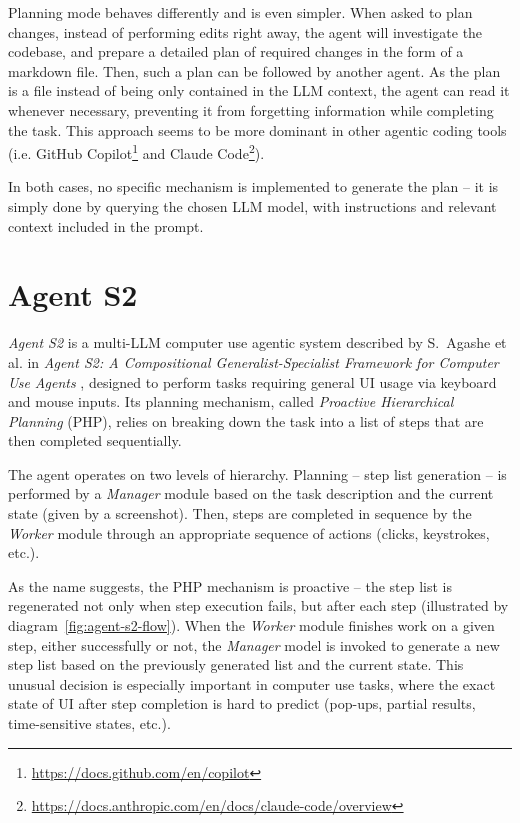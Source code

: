 \documentclass[a4paper,11pt,twoside]{report}
\theoremstyle{definition}
\begin{document}
Planning mode behaves differently and is even simpler. When asked to plan changes, instead of performing edits right away, the agent will investigate the codebase, and prepare a detailed plan of required changes in the form of a markdown file. Then, such a plan can be followed by another agent. As the plan is a file instead of being only contained in the LLM context, the agent can read it whenever necessary, preventing it from forgetting information while completing the task. This approach seems to be more dominant in other agentic coding tools (i.e. GitHub Copilot\footnote{\url{https://docs.github.com/en/copilot}} and Claude Code\footnote{\url{https://docs.anthropic.com/en/docs/claude-code/overview}}).

In both cases, no specific mechanism is implemented to generate the plan -- it is simply done by querying the chosen LLM model, with instructions and relevant context included in the prompt.

\section{Agent S2}

\textit{Agent S2} is a multi-LLM computer use agentic system described by S.~Agashe et al. in \textit{Agent S2: A Compositional Generalist-Specialist Framework for Computer Use Agents} \cite{agashe2025agents2}, designed to perform tasks requiring general UI usage via keyboard and mouse inputs. Its planning mechanism, called \textit{Proactive Hierarchical Planning} (PHP), relies on breaking down the task into a list of steps that are then completed sequentially.

The agent operates on two levels of hierarchy. Planning -- step list generation -- is performed by a \textit{Manager} module based on the task description and the current state (given by a screenshot). Then, steps are completed in sequence by the \textit{Worker} module through an appropriate sequence of actions (clicks, keystrokes, etc.).

As the name suggests, the PHP mechanism is proactive -- the step list is regenerated not only when step execution fails, but after each step (illustrated by diagram~\ref{fig:agent-s2-flow}). When the \textit{Worker} module finishes work on a given step, either successfully or not, the \textit{Manager} model is invoked to generate a new step list based on the previously generated list and the current state. This unusual decision is especially important in computer use tasks, where the exact state of UI after step completion is hard to predict (pop-ups, partial results, time-sensitive states, etc.).
\end{document}
